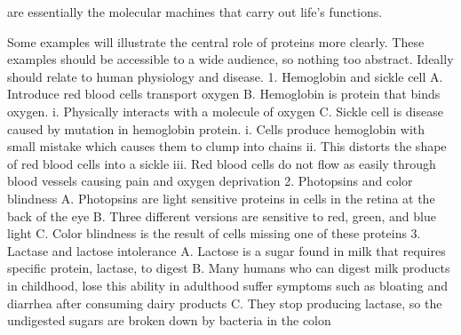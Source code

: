 are essentially the molecular machines that carry out life's functions.

Some examples will illustrate the central role of proteins more clearly.
These examples should be accessible to a wide audience, so nothing too abstract. Ideally should relate to human physiology and disease.
    1. Hemoglobin and sickle cell
        A. Introduce red blood cells transport oxygen
        B. Hemoglobin is protein that binds oxygen.
            i. Physically interacts with a molecule of oxygen
        C. Sickle cell is disease caused by mutation in hemoglobin protein.
            i. Cells produce hemoglobin with small mistake which causes them to clump into chains
            ii. This distorts the shape of red blood cells into a sickle
            iii. Red blood cells do not flow as easily through blood vessels causing pain and oxygen deprivation
    2. Photopsins and color blindness
        A. Photopsins are light sensitive proteins in cells in the retina at the back of the eye
        B. Three different versions are sensitive to red, green, and blue light
        C. Color blindness is the result of cells missing one of these proteins
    3. Lactase and lactose intolerance
        A. Lactose is a sugar found in milk that requires specific protein, lactase, to digest
        B. Many humans who can digest milk products in childhood, lose this ability in adulthood suffer symptoms such as bloating and diarrhea after consuming dairy products
        C. They stop producing lactase, so the undigested sugars are broken down by bacteria in the colon

